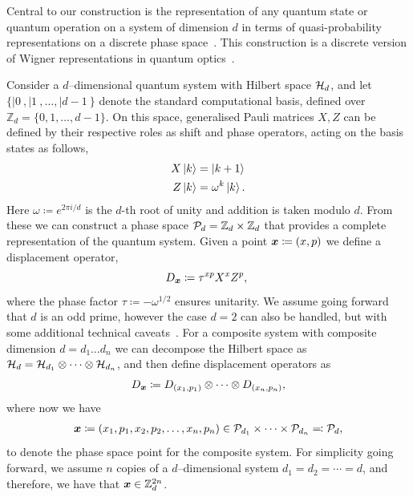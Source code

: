 \documentclass[pra,
aps,
twocolumn,
superscriptaddress,
groupedaddress,
nofootinbib,
reprint
]{revtex4-1}
\begin{document}
Central to our construction is the representation of any quantum state or quantum operation on a system of dimension $d$ in terms of quasi-probability representations on a discrete phase space~\cite{Ferrie_2008}. This construction is a discrete version of Wigner representations in quantum optics~\cite{Wigner_1932, Vourdas_2004}.

Consider a $d$--dimensional quantum system with Hilbert space $\H_d$, and let $\{ |0\>, |1\>, \dots , |d-1\>\}$ denote the standard computational basis, defined over $\mathbb{Z}_d = \{ 0, 1, \dots,d-1 \}$. On this space, generalised Pauli matrices $X, Z$ can be defined by their respective roles as shift and phase operators, acting on the basis states as follows,
\begin{align}
    X \ket{k} &= \ket{k + 1} \label{eq:xpauli}\\
	Z \ket{k} &= \omega^k \ket{k}. \label{eq:zpauli}
\end{align}
Here $\omega \coloneqq e^{2\pi i/d}$ is the $d$-th root of unity and addition is taken modulo $d$. From these we can construct a phase space $\cal{P}_d = \mathbb{Z}_d \times \mathbb{Z}_d$ that provides a complete representation of the quantum system. Given a point $\bmx \coloneqq (x, p)$ we define a displacement operator, 
\begin{equation}\label{eq:ddef}
    D_{\bmx} \coloneqq \tau^{x p} X^{x} Z^{p},\ 
\end{equation}
where the phase factor $\tau \coloneqq -\omega^{1/2}$ ensures unitarity. We assume going forward that $d$ is an odd prime, however the case $d=2$ can also be handled, but with some additional technical caveats~\cite{Appleby_2005}. For a composite system with composite dimension $d = d_1 \dots d_n$ we can decompose the Hilbert space as $\cal{H}_d = \cal{H}_{d_1} \otimes \dots \otimes \cal{H}_{d_n}$, and then define displacement operators as
\begin{equation}\label{eq:composited}
    D_{\bmx} \coloneqq D_{(x_1, p_1)} \otimes \dots \otimes D_{(x_n, p_n)},
\end{equation}
where now we have
\begin{align*}
	\bmx \coloneqq (x_1, p_1, x_2, p_2, \dots, x_n, p_n) \in \cal{P}_{d_1} \times \dots \times \cal{P}_{d_n} \eqqcolon  \cal{P}_d,
\end{align*}
to denote the phase space point for the composite system. 
For simplicity going forward, we assume $n$ copies of a $d$--dimensional system $d_1=d_2 = \cdots = d$, and therefore, we have that $\x \in \mathbb{Z}_d^{2n}$.
\end{document}
